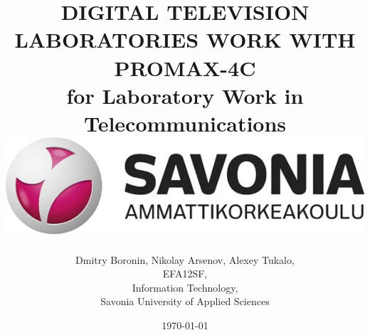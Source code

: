 \documentclass[english]{article}
\date{}
\begin{document}
\title{\vspace{2in}DIGITAL TELEVISION LABORATORIES WORK WITH PROMAX-4C\\
\small for Laboratory Work in Telecommunications\\
\vspace{0.5in}\includegraphics{savonia.jpg}}

\nopagebreak
\maketitle


\vspace{3in}

\author{
\begin{flushright}
Dmitry Boronin, Nikolay Arsenov, Alexey Tukalo,\\
EFA12SF,\\
Information Technology,\\
Savonia University of Applied Sciences
\end{flushright}
}

\date{\today}
\thispagestyle{empty}

\newpage
\setcounter{page}{1}
\setcounter{tocdepth}{2}
\tableofcontents

\newpage

\end{document}
